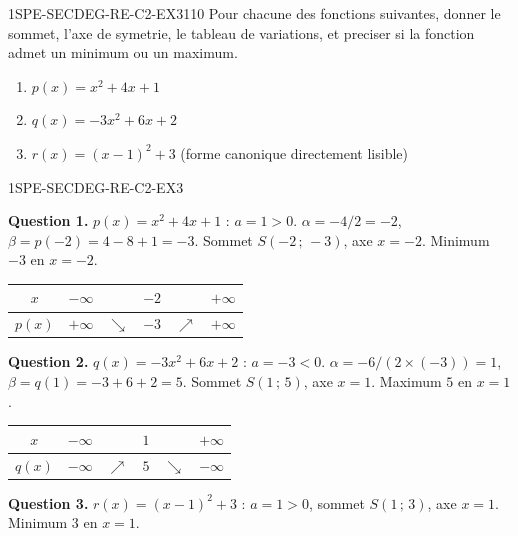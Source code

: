 
\begin{exercice}{1SPE-SECDEG-RE-C2-EX3}{1}{10}
Pour chacune des fonctions suivantes, donner le sommet, l'axe de symetrie, le tableau de variations, et preciser si la fonction admet un minimum ou un maximum.
\begin{enumerate}
  \item $p(x) = x^2 + 4x + 1$
  \item $q(x) = -3x^2 + 6x + 2$
  \item $r(x) = (x-1)^2 + 3$ \quad (forme canonique directement lisible)
\end{enumerate}
\end{exercice}


\begin{corrige}{1SPE-SECDEG-RE-C2-EX3}

\textbf{Question 1.} $p(x) = x^2 + 4x + 1$ : $a = 1 > 0$.
$\alpha = -4/2 = -2$, $\beta = p(-2) = 4 - 8 + 1 = -3$.
Sommet $S(-2\,;\,-3)$, axe $x = -2$. Minimum $-3$ en $x = -2$.

\begin{center}
\begin{tabular}{|c|ccccc|}
\hline
$x$ & $-\infty$ & & $-2$ & & $+\infty$ \\
\hline
$p(x)$ & $+\infty$ & $\searrow$ & $-3$ & $\nearrow$ & $+\infty$ \\
\hline
\end{tabular}
\end{center}

\textbf{Question 2.} $q(x) = -3x^2 + 6x + 2$ : $a = -3 < 0$.
$\alpha = -6/(2 \times (-3)) = 1$, $\beta = q(1) = -3 + 6 + 2 = 5$.
Sommet $S(1\,;\,5)$, axe $x = 1$. Maximum $5$ en $x = 1$.

\begin{center}
\begin{tabular}{|c|ccccc|}
\hline
$x$ & $-\infty$ & & $1$ & & $+\infty$ \\
\hline
$q(x)$ & $-\infty$ & $\nearrow$ & $5$ & $\searrow$ & $-\infty$ \\
\hline
\end{tabular}
\end{center}


\textbf{Question 3.} $r(x) = (x-1)^2 + 3$ : $a = 1 > 0$, sommet $S(1\,;\,3)$, axe $x = 1$. Minimum $3$ en $x = 1$.

\end{corrige}
